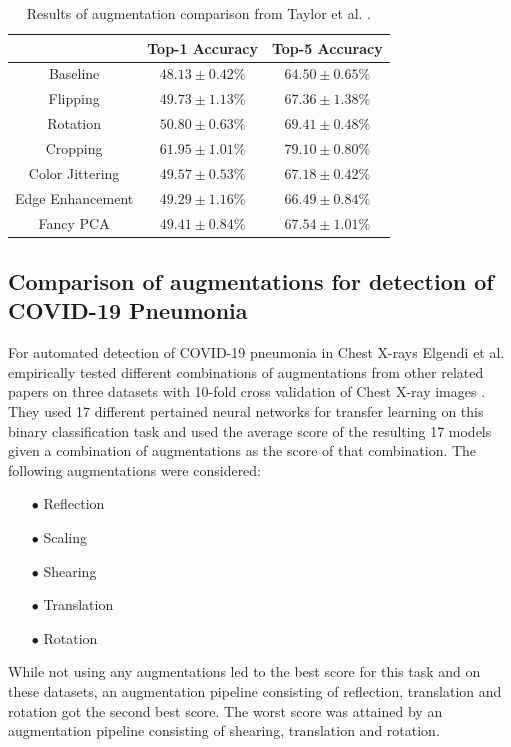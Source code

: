 \documentclass[10pt]{book}
\begin{document}
\begin{table}
  \begin{tabular}{ c c c }
    & Top-1 Accuracy & Top-5 Accuracy \\ 
   \hline
   Baseline & $48.13 \pm 0.42\%$ & $64.50 \pm 0.65\%$ \\
   Flipping & $49.73 \pm 1.13\%$ & $67.36 \pm 1.38\%$ \\
   Rotation & $50.80 \pm 0.63\%$ & $69.41 \pm 0.48\%$ \\
   Cropping & $61.95 \pm 1.01\%$ & $79.10 \pm 0.80\%$ \\
   Color Jittering & $49.57 \pm 0.53\%$ & $67.18 \pm 0.42\%$ \\
   Edge Enhancement & $49.29 \pm 1.16\%$ & $66.49 \pm 0.84\%$ \\
   Fancy PCA & $49.41 \pm 0.84\%$ & $67.54 \pm 1.01\%$ \\
   \hline
  \end{tabular}
  \caption{\label{tab:taylor-acc}Results of augmentation comparison from Taylor et al. \cite{8628742}.}
\end{table}

\subsection{Comparison of augmentations for detection of COVID-19 Pneumonia}

For automated detection of COVID-19 pneumonia in Chest X-rays Elgendi et al. empirically tested different combinations of augmentations from other related papers on three datasets with 10-fold cross validation of Chest X-ray images \cite{elgendi2021effectiveness}. They used 17 different pertained neural networks for transfer learning on this binary classification task and used the average score of the resulting 17 models given a combination of augmentations as the score of that combination. The following augmentations were considered:

\begin{itemize}
  \item[$\bullet$] Reflection
  \item[$\bullet$] Scaling
  \item[$\bullet$] Shearing
  \item[$\bullet$] Translation
  \item[$\bullet$] Rotation
\end{itemize}

While not using any augmentations led to the best score for this task and on these datasets, an augmentation pipeline consisting of reflection, translation and rotation got the second best score. The worst score was attained by an augmentation pipeline consisting of shearing, translation and rotation. 
\end{document}
